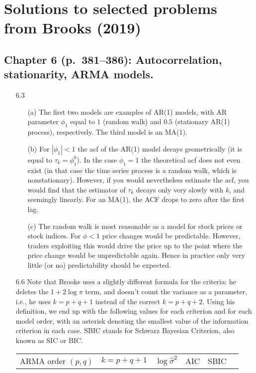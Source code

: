 \documentclass[11pt,a4paper]{article}
\begin{document}
\section*{Solutions to selected problems from Brooks (2019)}
\subsection*{Chapter 6 (p.\ 381--386): Autocorrelation, stationarity, ARMA models.}


\begin{itemize}
\item[6.3]
\begin{enumerate}
\item[(a)] The first two models are examples of AR(1) models, with AR parameter $\phi_1$ equal to $1$ (random walk) and $0.5$ (stationary AR(1) process), respectively. The third model is an MA(1).
\item[(b)] For $|\phi_1| < 1$ the acf of the AR(1) model decays geometrically
(it is equal to $\tau_k = \phi_1^k$).  In the case $\phi_1=1$ the theoretical
acf does not even exist (in that case the time series process is a random walk,
which is nonstationary). However, if you would nevertheless estimate the
acf, you would find that the estimator of $\tau_k$ decays only very slowly
with $k$, and seemingly linearly. For an MA(1), the ACF drops to zero after the first lag.
\item[(c)] The random walk is most reasonable as a model for stock prices or stock indices. For $\phi<1$ price changes would be predictable. However, traders
exploiting this would drive the price up to the point where the price change would be unpredictable again. Hence in practice only very little (or no)
predictability should be expected.
\end{enumerate}
\item[6.6] Note that Brooks uses a slightly different formula for the criteria: he deletes the $1+2\log\pi$ term, and doesn't count the variance as a parameter, i.e., he uses $k=p+q+1$ instead of the correct $k=p+q+2$. Using his definition, we end up with the following values for
each criterion and for each model order, with an asterisk denoting the smallest
value of the information criterion in each case. SBIC stands for Schwarz Bayesian Criterion, also known as SIC or BIC.
\begin{center}
\begin{tabular}{ccclll}
ARMA order $(p,q)$ & $k=p+q+1$ & $\log \hat \sigma^2$ & AIC & SBIC \\

\end{tabular}
\end{center}
\end{itemize}
\end{document}
